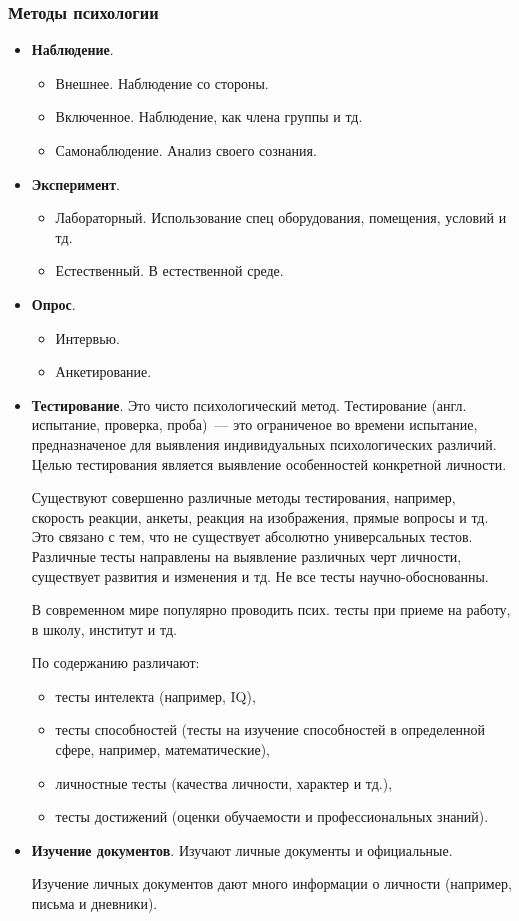 \subsubsection{Методы психологии}
\begin{itemize}
	\item \textbf{Наблюдение}.
		\begin{itemize}
			\item Внешнее. Наблюдение со стороны.
			\item Включенное. Наблюдение, как члена группы и тд.
			\item Самонаблюдение. Анализ своего сознания.
		\end{itemize}
	\item \textbf{Эксперимент}.
		\begin{itemize}
			\item Лабораторный. Использование спец оборудования, помещения, условий и тд.
			\item Естественный. В естественной среде.
		\end{itemize}
	\item \textbf{Опрос}.
		\begin{itemize}
			\item Интервью.
			\item Анкетирование.
		\end{itemize}
	\item \textbf{Тестирование}. Это чисто психологический метод. Тестирование (англ. испытание, проверка, проба)~--- это ограниченое во времени испытание, предназначеное для выявления индивидуальных психологических различий. Целью тестирования является выявление особенностей конкретной личности.
	
	Существуют совершенно различные методы тестирования, например, скорость реакции, анкеты, реакция на изображения, прямые вопросы и тд. Это связано с тем, что не существует абсолютно универсальных тестов. Различные тесты направлены на выявление различных черт личности, существует развития и изменения и тд. Не все тесты научно-обоснованны.
	
	В современном мире популярно проводить псих. тесты при приеме на работу, в школу, институт и тд.
	
	По содержанию различают:
		\begin{itemize}
			\item тесты интелекта (например, IQ),
			\item тесты способностей (тесты на изучение способностей в определенной сфере, например, математические),
			\item личностные тесты (качества личности, характер и тд.),
			\item тесты достижений (оценки обучаемости и профессиональных знаний).
		\end{itemize}
	\item \textbf{Изучение документов}. Изучают личные документы и официальные.
	
	Изучение личных документов дают много информации о личности (например, письма и дневники).
\end{itemize}

